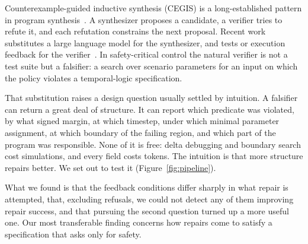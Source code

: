 \documentclass{article}
\begin{document}
Counterexample-guided inductive synthesis (CEGIS) is a long-established pattern in
program synthesis~\citep{solarlezama2006}. A synthesizer proposes a candidate, a
verifier tries to refute it, and each refutation constrains the next proposal.
Recent work substitutes a large language model for the synthesizer, and tests or
execution feedback for the
verifier~\citep{madaan2023selfrefine,shinn2023reflexion,chen2024selfdebug,orvalho2025cegis}.
In safety-critical control the natural verifier is not a test suite but a
falsifier: a search over scenario parameters for an input on which the policy
violates a temporal-logic specification.

That substitution raises a design question usually settled by intuition. A
falsifier can return a great deal of structure. It can report which predicate was
violated, by what signed margin, at which timestep, under which minimal
parameter assignment, at which boundary of the failing region, and which part of
the program was responsible. None of it is free: delta debugging and boundary
search cost simulations, and every field costs tokens. The intuition is that more
structure repairs better. We set out to test it (Figure~\ref{fig:pipeline}).

What we found is that the feedback conditions differ sharply in what repair is
attempted, that, excluding refusals, we could not detect any of them improving
repair success, and that pursuing the second question turned up a more useful one. Our
most transferable finding concerns how repairs come to satisfy a specification
that asks only for safety.
\end{document}

